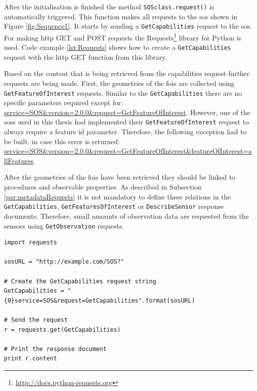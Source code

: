 \begin{sloppypar}
After the initialisation is finished the method \texttt{SOSclass.request()} is automatically triggered. This function makes all requests to the \ac{sos} shown in Figure \ref{fig:Sequence1}. It starts by sending a \texttt{GetCapabilities} request to the \ac{sos}. For making \ac{http} GET and POST requests the Requests\footnote{\url{http://docs.python-requests.org}} library for Python is used. Code example \ref{lst:Requests} shows how to create a \texttt{GetCapabilities} request with the \ac{http} GET function from this library.
\end{sloppypar}

\begin{sloppypar}
	Based on the content that is being retrieved from the capabilities request further requests are being made. First, the geometries of the \acp{foi} are collected using \texttt{GetFeatureOfInterest} requests. Similar to the \texttt{GetCapabilities} there are no specific parameters required except for: \url{service=SOS&version=2.0.0&request=GetFeatureOfInterest}. However, one of the \aclp{sos} used in this thesis had implemented their \texttt{GetFeatureOfInterest} request to always require a feature id parameter. Therefore, the following exception had to be built, in case this error is returned: \url{service=SOS&version=2.0.0&request=GetFeatureOfInterest&featureOfInterest=allFeatures}.
\end{sloppypar}

\begin{sloppypar}
After the geometries of the \acp{foi} have been retrieved they should be linked to procedures and observable properties. As described in Subsection \ref{par:metadataRequests} it is not mandatory to define these relations in the \texttt{GetCapabilities}, \texttt{GetFeaturesOfInterest} or \texttt{DescribeSensor} response documents. Therefore, small amounts of observation data are requested from the sensors using \texttt{GetObservation} requests.  
\end{sloppypar}

\begin{lstlisting}[float,caption={Creating a HTTP Get request using Python's Request library}, label={lst:Requests}]
import requests

sosURL = "http://example.com/SOS?"

# Create the GetCapabilities request string
GetCapabilities = "{0}service=SOS&request=GetCapabilities".format(sosURL)

# Send the request
r = requests.get(GetCapabilities)

# Print the response document
print r.content

\end{lstlisting}   


